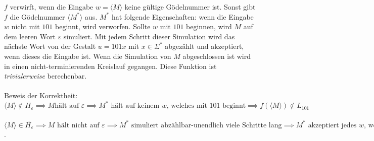 $f$ verwirft, wenn die Eingabe $w = \langle M \rangle$ keine gültige Gödelnummer ist. Sonst gibt $f$ die Gödelnummer $\langle M^* \rangle$ aus. $M^*$ hat folgende Eigenschaften: wenn die Eingabe $w$ nicht mit $101$ beginnt, wird verworfen. Sollte $w$ mit $101$ beginnen, wird $M$ auf dem leeren Wort $\varepsilon$ simuliert. Mit jedem Schritt dieser Simulation wird das nächste Wort von der Gestalt $u = 101x$ mit $x \in \Sigma^*$ abgezählt und akzeptiert, wenn dieses die Eingabe ist. Wenn die Simulation von $M$ abgeschlossen ist wird in einen nicht-terminierenden Kreislauf gegangen. Diese Funktion ist \textit{trivialerweise} berechenbar.\\ \ \\
Beweis der Korrektheit:\\
$\langle M \rangle \notin \overline{H_{\varepsilon}} \implies M \text{hält auf } \varepsilon \implies M^*  \text{ hält auf keinem $w$, welches mit 101 beginnt} \implies f(\langle M \rangle) \notin L_{101}$\\ \ \\
$\langle M \rangle \in \overline{H_{\varepsilon}} \implies \text{$M$ hält nicht auf $\varepsilon$} \implies M^*  \text{ simuliert abzählbar-unendlich viele Schritte lang} \implies M^*  \text{ akzeptiert jedes $w$, welches mit 101 beginnt. Insbesondere hält $M^*$ dann.} \implies f(\langle M \rangle) \in L_{101}$.
